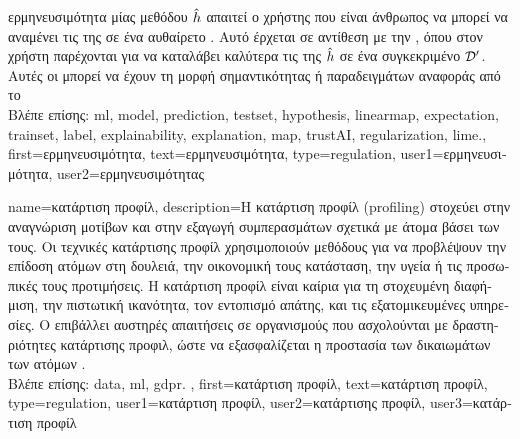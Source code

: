 {{{		ερμηνευσιμότητα μίας μεθόδου}  $\hat{h}$ \foreignlanguage{greek}{απαι\-τεί ο χρήστης που είναι 
		άνθρωπος να μπορεί να αναμένει τις}  \foreignlanguage{greek}{της σε ένα αυθαίρετο} 
	 	. \foreignlanguage{greek}{Αυτό έρχεται σε αντίθεση με την} , 
		\foreignlanguage{greek}{όπου στον χρήστη παρέχονται}  \foreignlanguage{greek}{για να καταλάβει 
		καλύτερα τις}  \foreignlanguage{greek}{της $\hat{h}$ σε ένα συγκεκριμένο}  
		$\mathcal{D}'$. \foreignlanguage{greek}{Αυτές οι}  \foreignlanguage{greek}{μπορεί να έχουν τη μορφή} 
		 \foreignlanguage{greek}{σημαντικότητας ή παραδειγμάτων αναφοράς από το} 
		\\ 
	 	\foreignlanguage{greek}{Βλέπε επίσης:} \gls{ml}, \gls{model}, \gls{prediction}, \gls{testset}, \gls{hypothesis}, \gls{linearmap}, 
		\gls{expectation}, \gls{trainset}, \gls{label}, \gls{explainability}, \gls{explanation}, \gls{map}, \gls{trustAI}, \gls{regularization}, 
		\gls{lime}.},
	first={\foreignlanguage{greek}{ερμηνευσιμότητα}},
	text={\foreignlanguage{greek}{ερμηνευσιμότητα}},
	type=regulation,
	user1={\foreignlanguage{greek}{ερμηνευσιμότητα}}, %
	user2={\foreignlanguage{greek}{ερμηνευσιμότητας}} %
}

{name={\foreignlanguage{greek}{κατάρτιση προφίλ}},
	description={\foreignlanguage{greek}{Η κατάρτιση προφίλ} 
		(profiling) \foreignlanguage{greek}{στοχεύει στην αναγνώριση μοτίβων και στην εξαγωγή συμπερασμάτων 
		σχετικά με άτομα βάσει των}  \foreignlanguage{greek}{τους. Οι τεχνικές 
		κατάρτισης προφίλ χρησιμοποιούν μεθόδους}  \foreignlanguage{greek}{για να 
		προβλέψουν την επίδοση ατόμων στη δουλειά, την οικονομική τους κατάσταση, την υγεία ή 
		τις προσωπικές τους προτιμήσεις. Η κατάρτιση προφίλ είναι καίρια για τη στοχευμένη διαφήμιση, 
		την πιστωτική ικανότητα, τον εντοπισμό απάτης, και τις εξατομικευμένες υπηρεσίες. Ο}
		 \foreignlanguage{greek}{επιβάλλει αυστηρές απαιτήσεις σε οργανισμούς  
		που ασχολούνται με δραστηριότητες κατάρτισης προφιλ, ώστε να εξασφαλίζεται η προστασία των  
		δικαιωμάτων των ατόμων} \cite{GDPR2016}. 
		\\
		\foreignlanguage{greek}{Βλέπε επίσης:} \gls{data}, \gls{ml}, \gls{gdpr}. },
	first={\foreignlanguage{greek}{κατάρτιση προφίλ}},
	text={\foreignlanguage{greek}{κατάρτιση προφίλ}},
	type=regulation,
	user1={\foreignlanguage{greek}{κατάρτιση προφίλ}}, %
	user2={\foreignlanguage{greek}{κατάρτισης προφίλ}}, %
	user3={\foreignlanguage{greek}{κατάρτιση προφίλ}} %
}

